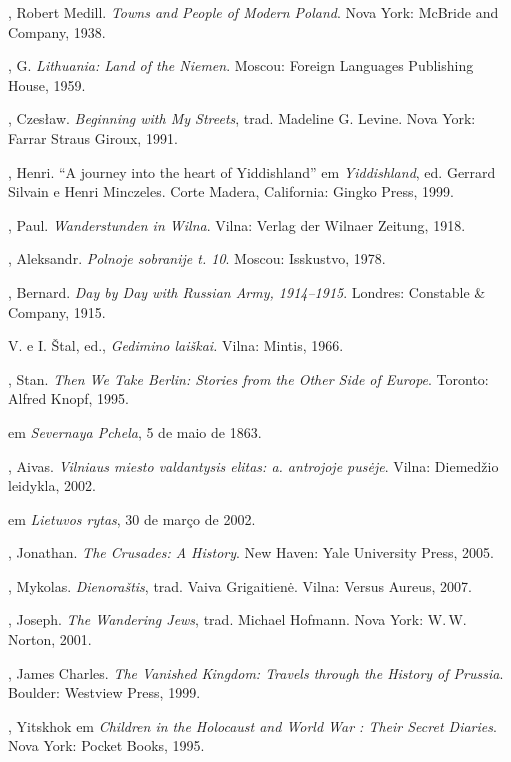 \begin{bibliohedra}
  , Robert Medill. \textit{Towns and People of Modern Poland}. Nova
  York: McBride and Company, 1938.

  , G. \textit{Lithuania: Land of the Niemen}. Moscou: Foreign
  Languages Publishing House, 1959.

  , Czesław. \textit{Beginning with My Streets}, trad. Madeline G.
  Levine. Nova York: Farrar Straus Giroux, 1991.

  , Henri. ``A journey into the heart of Yiddishland'' em
  \textit{Yiddishland}, ed. Gerrard Silvain e Henri Minczeles. Corte
  Madera, California: Gingko Press, 1999.

  , Paul. \textit{Wanderstunden in Wilna}. Vilna: Verlag der Wilnaer
  Zeitung, 1918.

  , Aleksandr. \textit{Polnoje sobranije t. 10}. Moscou: Isskustvo, 1978.

  , Bernard. \textit{Day by Day with Russian Army, 1914--1915}.
  Londres: Constable \& Company, 1915.

   V. e I. Štal, ed., \textit{Gedimino laiškai.} Vilna: Mintis,
  1966.

  , Stan. \textit{Then We Take Berlin: Stories from the Other Side
  of Europe}. Toronto: Alfred Knopf, 1995.

   em \textit{Severnaya Pchela}, 5 de maio de 1863.

  , Aivas. \textit{Vilniaus miesto valdantysis elitas:  a.
  antrojoje pusėje}. Vilna: Diemedžio leidykla, 2002.

   em \textit{Lietuvos rytas},
  30 de março de 2002.

  , Jonathan. \textit{The Crusades: A History}. New Haven: Yale
  University Press, 2005.

  , Mykolas. \textit{Dienoraštis}, trad. Vaiva Grigaitienė.
  Vilna: Versus Aureus, 2007.

  , Joseph. \textit{The Wandering Jews}, trad. Michael Hofmann. Nova
  York: W.\,W. Norton, 2001.

  , James Charles. \textit{The Vanished Kingdom: Travels through the
  History of Prussia}. Boulder: Westview Press, 1999.

  , Yitskhok em \textit{Children in the Holocaust and World
  War : Their Secret Diaries}. Nova York: Pocket
  Books, 1995.


\end{bibliohedra}
